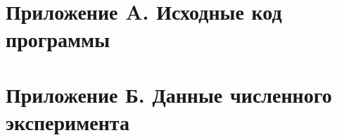 \section*{Приложение A. Исходные код программы}\label{app:A}

\newpage
{}
\section*{Приложение Б. Данные численного эксперимента}\label{app:B}


